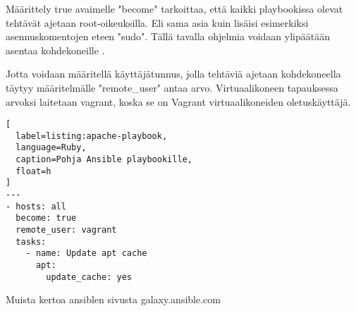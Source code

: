 Määrittely true avaimelle "become" tarkoittaa, että kaikki playbookissa olevat tehtävät ajetaan root-oikeuksilla. Eli sama asia kuin lisäisi esimerkiksi asennuskomentojen eteen "sudo". Tällä tavalla ohjelmia voidaan ylipäätään asentaa kohdekoneille \cite{link:ansible-configuration-file}.

Jotta voidaan määritellä käyttäjätunnus, jolla tehtäviä ajetaan kohdekoneella täytyy määritelmälle "remote\_user" antaa arvo. Virtuaalikoneen tapauksessa arvoksi laitetaan vagrant, koska se on Vagrant virtuaalikoneiden oletuskäyttäjä.

\begin{lstlisting}[
  label=listing:apache-playbook,
  language=Ruby,
  caption=Pohja Ansible playbookille,
  float=h
]
---
- hosts: all
  become: true
  remote_user: vagrant
  tasks:
    - name: Update apt cache
      apt:
        update_cache: yes
\end{lstlisting}


Muista kertoa ansiblen sivusta galaxy.ansible.com